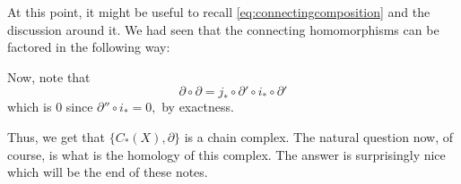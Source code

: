 \documentclass[12pt]{article}
\begin{document}
At this point, it might be useful to recall \cref{eq:connectingcomposition} and the discussion around it. We had seen that the connecting homomorphisms can be factored in the following way:

\begin{center}
\end{center}

Now, note that 
\begin{equation*} 
	\partial\circ\partial = j_* \circ \partial' \circ i_* \circ \partial'
\end{equation*}
which is $0$ since $\partial''\circ i_* = 0,$ by exactness.

Thus, we get that $\{C_*(X), \partial\}$ is a chain complex. The natural question now, of course, is what is the homology of this complex. The answer is surprisingly nice which will be the end of these notes.
\end{document}
